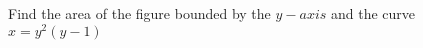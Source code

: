 
%
%
%
%
% 
% 

\question[3] Find the area of the figure bounded by the $y-axis$ and the curve 
$x=y^2(y-1)$


\ifprintanswers
\fi 

